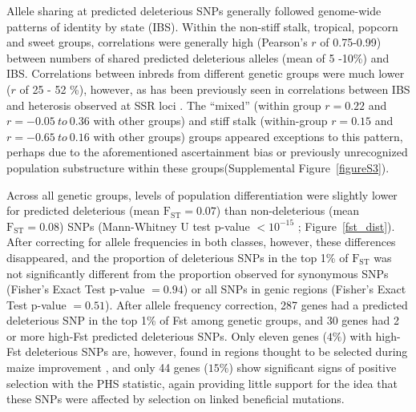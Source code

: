 \documentclass[12pt]{article}
\begin{document}
Allele sharing at predicted deleterious SNPs generally followed genome-wide patterns of identity by state (IBS). Within the non-stiff stalk, tropical, popcorn and sweet groups, correlations were generally high (Pearson's $r$ of 0.75-0.99) between numbers of shared predicted deleterious alleles (mean of 5 -10\%) and IBS. Correlations between inbreds from different genetic groups were much lower ($r$ of 25 - 52 \%), however, as has been previously seen in correlations  between IBS and heterosis observed at SSR loci \citep{Flint-Garcia2009}. The  ``mixed'' (within group $r=0.22$ and $r=-0.05\ to\ 0.36$ with other groups) and stiff stalk (within-group $r=0.15$ and $r=-0.65\ to\ 0.16$ with other groups) groups appeared exceptions to this pattern, perhaps due to the aforementioned ascertainment bias or previously unrecognized population substructure within these groups(Supplemental Figure~\ref{figureS3}). 

Across all genetic groups, levels of population differentiation were slightly lower for predicted deleterious (mean $\mathrm{F}_{\mathrm{ST}}=0.07$) than non-deleterious (mean $\mathrm{F}_{\mathrm{ST}}=0.08$) SNPs (Mann-Whitney U test p-value $< 10^{-15}$ ; Figure~\ref{fst_dist}). After correcting 
for allele frequencies in both classes, however, these differences disappeared, and the proportion of deleterious SNPs in the top 1\% of $\mathrm{F}_{\mathrm{ST}}$ was not significantly different from the proportion observed for synonymous SNPs (Fisher's Exact Test p-value $= 0.94$) or all SNPs in genic regions (Fisher's Exact Test p-value $= 0.51$).
After allele frequency correction, 287 genes had a predicted deleterious SNP in the top 1\% of Fst among genetic groups, and 30 genes had 2 or more high-Fst predicted deleterious SNPs.  Only eleven genes ($4\%$) with high-Fst deleterious SNPs  are, however, found in regions thought to be selected during maize improvement  \citep{Hufford2012}, and only 44 genes ($15\%$) show significant signs of positive selection with the PHS statistic, again providing little support for the idea that these SNPs were affected by selection on linked beneficial mutations.
\end{document}
